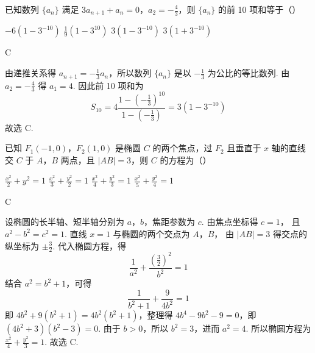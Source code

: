 \begin{problem}
已知数列 \( \{a_{n}\} \) 满足 \(3a_{n+1} + a_{n} = 0\)，\(a_{2} = -\frac{4}{3}\)，则 \( \{a_{n}\} \) 的前 10 项和等于（\quad）

\choices
    {\(-6(1 - 3^{-10})\)}
    {\(\frac{1}{9}(1 - 3^{10})\)}
    {\(3(1 - 3^{-10})\)}
    {\(3(1 + 3^{-10})\)}

\begin{answer}
C
\end{answer}

\begin{solution}
由递推关系得 \(a_{n+1}=-\frac{1}{3}a_n\)，所以数列 \(\{a_n\}\) 是以 \(-\frac{1}{3}\) 为公比的等比数列.
由 \(a_2=-\frac{4}{3}\) 得 \(a_1=4\). 因此前 10 项和为
\[
S_{10}=4\frac{1-\left(-\frac{1}{3}\right)^{10}}{1-\left(-\frac{1}{3}\right)}
=3\left(1-3^{-10}\right)
\]
故选 C.
\end{solution}
\end{problem}

\begin{problem}
已知 \(F_{1}(-1,0)\)，\(F_{2}(1,0)\) 是椭圆 \(C\) 的两个焦点，过 \(F_{2}\) 且垂直于 \(x\) 轴的直线交 \(C\) 于 \(A\)，\(B\) 两点，且 \(|AB| = 3\)，则 \(C\) 的方程为（\quad）

\choices
    {\(\frac{x^2}{2} + y^2 = 1\)}
    {\(\frac{x^2}{3} + \frac{y^2}{2} = 1\)}
    {\(\frac{x^2}{4} + \frac{y^2}{3} = 1\)}
    {\(\frac{x^2}{5} + \frac{y^2}{4} = 1\)}

\begin{answer}
C
\end{answer}

\begin{solution}
设椭圆的长半轴、短半轴分别为 \(a\)，\(b\)，焦距参数为 \(c\). 由焦点坐标得 \(c=1\)，
且 \(a^2-b^2=c^2=1\). 直线 \(x=1\) 与椭圆的两个交点为 \(A\)，\(B\)，
由 \(|AB|=3\) 得交点的纵坐标为 \(\pm\frac{3}{2}\). 代入椭圆方程，得
\[
\frac{1}{a^2}+\frac{\left(\frac{3}{2}\right)^2}{b^2}=1
\]
结合 \(a^2=b^2+1\)，可得
\[
\frac{1}{b^2+1}+\frac{9}{4b^2}=1
\]
即 \(4b^2+9(b^2+1)=4b^2(b^2+1)\)，整理得
\(4b^4-9b^2-9=0\)，即 \((4b^2+3)(b^2-3)=0\).
由于 \(b>0\)，所以 \(b^2=3\)，进而 \(a^2=4\).
所以椭圆方程为 \(\frac{x^2}{4}+\frac{y^2}{3}=1\). 故选 C.
\end{solution}
\end{problem}

